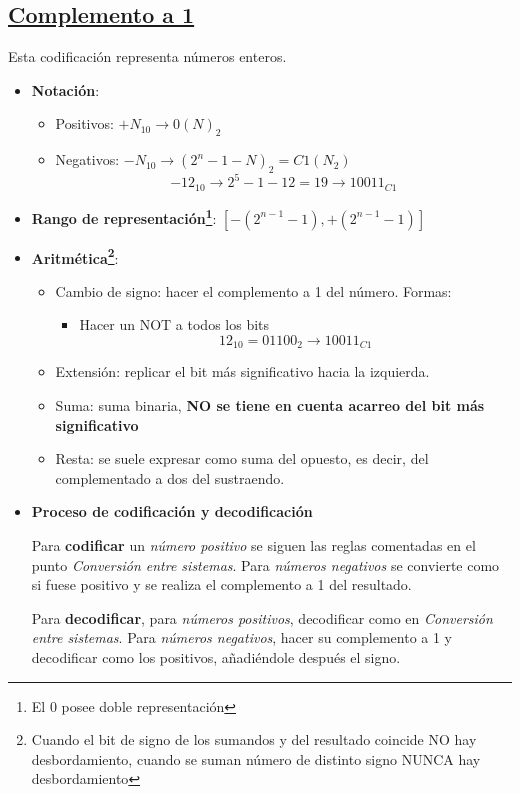 \documentclass[a4paper,10pt]{book}
\begin{document}
\subsection*{\underline{Complemento a 1}}
Esta codificación representa números enteros.
\begin{itemize}
\item \textbf{Notación}:
\begin{itemize}
	\item Positivos: $+N_{10}\rightarrow 0(N)_2$
	\item Negativos: $-N_{10}\rightarrow (2^n-1-N)_2=C1(N_2)$
$$-12_{10}\rightarrow 2^5-1-12=19 \rightarrow 10011_{C1}$$
	\end{itemize}
\item \textbf{Rango de representación\footnote{El 0 posee doble representación}}: $[-(2^{n-1}-1),+(2^{n-1}-1)]$
\item \textbf{Aritmética\footnote{Cuando el bit de signo de los sumandos y del resultado coincide NO hay desbordamiento, cuando se suman número de distinto signo NUNCA hay desbordamiento}}:
	\begin{itemize}
	\item Cambio de signo: hacer el complemento a 1 del número. Formas:
		\begin{itemize}
		\item Hacer un NOT a todos los bits
				$$12_{10}=01100_2 \rightarrow 10011_{C1}$$
		\end{itemize}
	\item Extensión: replicar el bit más significativo hacia la izquierda.
	\item Suma: suma binaria, \textbf{NO se tiene en cuenta acarreo del bit más significativo}
	\item Resta: se suele expresar como suma del opuesto, es decir, del complementado a dos del sustraendo.
	\end{itemize}
\item \textbf{Proceso de codificación y decodificación}\par
Para \textbf{codificar} un \emph{número positivo} se siguen las reglas comentadas en el punto \textit{Conversión entre sistemas}. Para \emph{números negativos} se convierte como si fuese positivo y se realiza el complemento a 1 del resultado.\par
Para \textbf{decodificar}, para \emph{números positivos}, decodificar como en \textit{Conversión entre sistemas}. Para \emph{números negativos}, hacer su complemento a 1 y decodificar como los positivos, añadiéndole después el signo.
\end{itemize}
\end{document}
